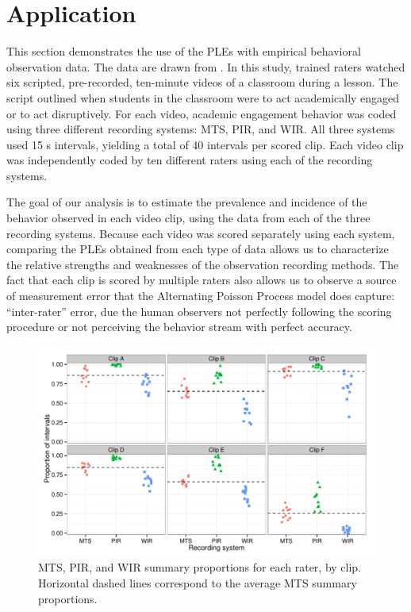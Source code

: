 \documentclass[man, noextraspace, floatsintext]{apa6}\usepackage[]{graphicx}\usepackage[]{color}
\makeatletter
\def\maxwidth{ %
  \ifdim\Gin@nat@width>\linewidth
    \linewidth
  \else
    \Gin@nat@width
  \fi
}
\newenvironment{knitrout}{}{} %
\makeatother
\begin{document}
\section{Application}
\label{sec:application}



This section demonstrates the use of the PLEs with empirical behavioral observation data. The data are drawn from \citet{Johnson2014reliability}. 
In this study, trained raters watched six scripted, pre-recorded, ten-minute videos of a classroom during a lesson. 
The script outlined when students in the classroom were to act academically engaged or to act disruptively. 
For each video, academic engagement behavior was coded using three different recording systems: MTS, PIR, and WIR. 
All three systems used 15 s intervals, yielding a total of 40 intervals per scored clip.
Each video clip was independently coded by ten different raters using each of the recording systems. 

The goal of our analysis is to estimate the prevalence and incidence of the behavior observed in each video clip, using the data from each of the three recording systems. 
Because each video was scored separately using each system, comparing the PLEs obtained from each type of data allows us to characterize the relative strengths and weaknesses of the observation recording methods. The fact that each clip is scored by multiple raters also allows us to observe a source of measurement error that the Alternating Poisson Process model does capture: ``inter-rater'' error, due the human observers not perfectly following the scoring procedure or not perceiving the behavior stream with perfect accuracy.

\begin{knitrout}
\color{fgcolor}\begin{figure}[tb]


{\centering \includegraphics[width=\maxwidth]{fig/summary_prop} 

}

\caption[MTS, PIR, and WIR summary proportions for each rater, by clip]{MTS, PIR, and WIR summary proportions for each rater, by clip. Horizontal dashed lines correspond to the average MTS summary proportions.\label{fig:summary_prop}}
\end{figure}


\end{knitrout}
\end{document}
